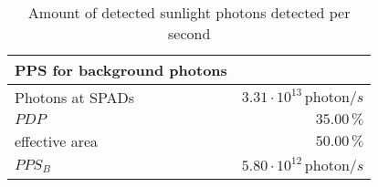 \begin{table}[H]
\centering
\caption{Amount of detected sunlight photons detected per second}
\label{tab:PPS}
\begin{tabular}{|l|r|}\hline
    \textbf{PPS for background photons} & \\
    \hline 
    Photons at SPADs & $3.31\cdot10^{13}\,\text{photon}/s$ \\
    $PDP$ & $35.00\, \%$ \\
    effective area & $50.00\, \%$ \\
    $PPS_B$ & $5.80\cdot10^{12}\,\text{photon}/s$ \\
    \hline 
\end{tabular}
\end{table}
